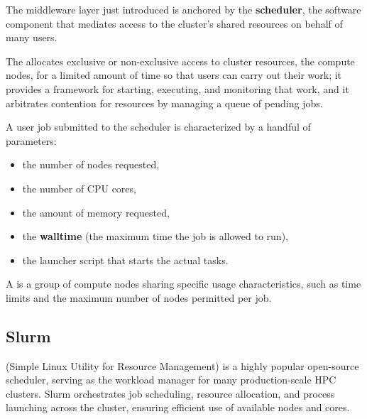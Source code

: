 The middleware layer just introduced is anchored by the \textbf{scheduler}, the software component that mediates access to the cluster's shared resources on behalf of many users.

\begin{definitionblock}[Scheduler]
    The  allocates exclusive or non-exclusive access to cluster resources, the compute nodes, for a limited amount of time so that users can carry out their work; it provides a framework for starting, executing, and monitoring that work, and it arbitrates contention for resources by managing a queue of pending jobs.
\end{definitionblock}

A user job submitted to the scheduler is characterized by a handful of parameters: 
\begin{itemize}
    \item the number of nodes requested,
    \item the number of CPU cores,
    \item the amount of memory requested,
    \item the \textbf{walltime} (the maximum time the job is allowed to run),
    \item the launcher script that starts the actual tasks.
\end{itemize}

\begin{definitionblock}[Partition]
    A  is a group of compute nodes sharing specific usage characteristics, such as time limits and the maximum number of nodes permitted per job.
\end{definitionblock}

\subsection{Slurm}

 (Simple Linux Utility for Resource Management) is a highly popular open-source scheduler, serving as the workload manager for many production-scale HPC clusters. Slurm orchestrates job scheduling, resource allocation, and process launching across the cluster, ensuring efficient use of available nodes and cores.

\medskip


